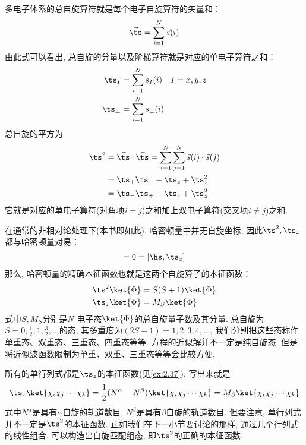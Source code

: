多电子体系的总自旋算符就是每个电子自旋算符的矢量和：
\begin{align}
\vec{\ts} = \sum_{i=1}^{N}\vec{s}(i)
\end{align}
由此式可以看出, 
总自旋的分量以及阶梯算符就是对应的单电子算符之和：
\begin{subequations}
	\begin{align}
	\ts_I   & = \sum_{i=1}^{N}s_I(i)\quad I=x,y,z\\
	\ts_\pm & = \sum_{i=1}^{N}s_\pm(i) 
	\end{align}
\end{subequations}
总自旋的平方为
\begin{align}
\ts^2 & = \vec{\ts}\cdot\vec{\ts} = \sum_{i=1}^{N}\sum_{j=1}^{N} \vec{s}(i)\cdot\vec{s}(j) \notag \\
      & = \ts_+\ts_- - \ts_z + \ts^2_z\notag\\
      & = \ts_-\ts_+ + \ts_z + \ts^2_z
\end{align}
它就是对应的单电子算符(对角项$i=j$)之和加上双电子算符(交叉项$i\neq j$)之和.


在通常的非相对论处理下(本书即如此), 
哈密顿量中并无自旋坐标, 
因此$\ts^2,\ts_z$都与哈密顿量对易：
\begin{align}
[\hs,\ts^2] = 0 = [\hs,\ts_z]
\end{align} 
那么, 
哈密顿量的精确本征函数也就是这两个自旋算子的本征函数：
\begin{subequations}
	\begin{align}
	\ts^2\ket{\Phi} & = S(S+1)\ket{\Phi}\\
	\ts_z\ket{\Phi} & = M_S\ket{\Phi}
	\end{align}
\end{subequations}
式中$S,M_S$分别是$N$-电子态$\ket{\Phi}$的总自旋量子数及其分量. 
总自旋为$S=0,\frac{1}{2},1,\frac{3}{2},\ldots$的态, 
其多重度为$(2S+1)=1,2,3,4,\ldots$, 
我们分别把这些态称作单重态、双重态、三重态、四重态等等. 
\sch 方程的近似解并不一定是纯自旋态. 
但是将近似波函数限制为单重、双重、三重态等等会比较方便.


所有的单行列式都是$\ts_z$的本征函数(见\autoref{ex:2.37}). 
写出来就是
\begin{align}
\label{eq:2.254}
\ts_z\ket{\chi_i\chi_j\cdots\chi_k} = \frac{1}{2}(N^\alpha - N^\beta)\ket{\chi_i\chi_j\cdots\chi_k} = M_S\ket{\chi_i\chi_j\cdots\chi_k}
\end{align}
式中$N^\alpha$是具有$\alpha$自旋的轨道数目, 
$N^\beta$是具有$\beta$自旋的轨道数目. 
但要注意, 
单行列式并不一定是$\ts^2$的本征函数. 
正如我们在下一小节要讨论的那样, 
通过几个行列式的线性组合, 
可以构造出自旋匹配组态, 
即$\ts^2$的正确的本征函数.

